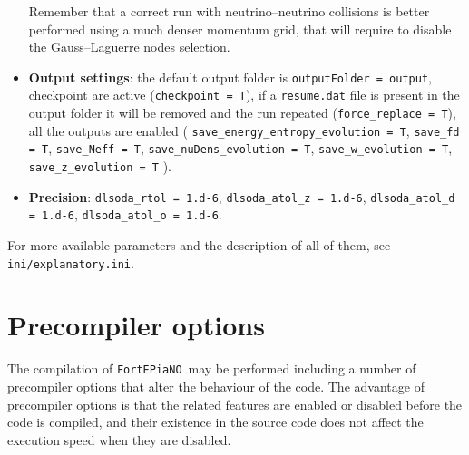 \documentclass[notitlepage,nofootinbib,showpacs,preprintnumbers,amsmath,amssymb,superscriptaddress,prd,onecolumn]{revtex4-1}
\newcommand{\fortepiano}{\texttt{FortEPiaNO}}
\begin{document}
\begin{itemize}
Remember that a correct run with neutrino--neutrino collisions is better performed
using a much denser momentum grid, that will require to disable the Gauss--Laguerre nodes selection.
%
\item
\textbf{Output settings}:
the default output folder is \texttt{outputFolder = output},
checkpoint are active (\texttt{checkpoint = T}),
if a \texttt{resume.dat} file is present in the output folder it will be removed and the run repeated
(\texttt{force\_replace = T}),
all the outputs are enabled (%
\texttt{save\_energy\_entropy\_evolution = T},
\texttt{save\_fd = T},
\texttt{save\_Neff = T},
\texttt{save\_nuDens\_evolution = T},
\texttt{save\_w\_evolution = T},
\texttt{save\_z\_evolution = T}%
).
%
\item \textbf{Precision}:
\texttt{dlsoda\_rtol = 1.d-6},
\texttt{dlsoda\_atol\_z = 1.d-6},
\texttt{dlsoda\_atol\_d = 1.d-6},
\texttt{dlsoda\_atol\_o = 1.d-6}.
\end{itemize}
For more available parameters and the description of all of them, see \texttt{ini/explanatory.ini}.


\section{Precompiler options}
\label{ssec:precompiler}
The compilation of \fortepiano\ may be performed including a number of precompiler options
that alter the behaviour of the code.
The advantage of precompiler options is that the related features are enabled or disabled
before the code is compiled, and their existence in the source code
does not affect the execution speed when they are disabled.
\end{document}
